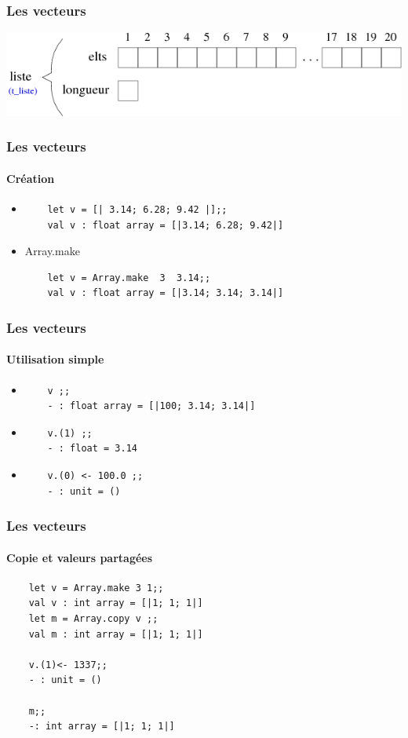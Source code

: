 \begin{frame}
	\frametitle{Les vecteurs}
	\includegraphics[scale=0.5]{pics/vect.png}
\end{frame}

\begin{frame}[fragile]
	\frametitle{Les vecteurs}
	\framesubtitle{Création}
	\begin{itemize}
	\item
	\begin{lstlisting}
	let v = [| 3.14; 6.28; 9.42 |];;
	val v : float array = [|3.14; 6.28; 9.42|]
	\end{lstlisting}

	\item Array.make
	\begin{lstlisting}
	let v = Array.make  3  3.14;;
	val v : float array = [|3.14; 3.14; 3.14|]
	\end{lstlisting}

	\end{itemize}
\end{frame}


\begin{frame}[fragile]
	\frametitle{Les vecteurs}
	\framesubtitle{Utilisation simple}
	\begin{itemize}
	\item
	\begin{lstlisting}
	v ;;
	- : float array = [|100; 3.14; 3.14|]
	\end{lstlisting}

	\item
	\begin{lstlisting}
	v.(1) ;;
	- : float = 3.14
	\end{lstlisting}

	\item
	\begin{lstlisting}
	v.(0) <- 100.0 ;;
	- : unit = ()
	\end{lstlisting}
	\end{itemize}
\end{frame}

\begin{frame}[fragile]
	\frametitle{Les vecteurs}
	\framesubtitle{Copie et valeurs partagées}
	\begin{lstlisting}
	let v = Array.make 3 1;;
	val v : int array = [|1; 1; 1|]
	let m = Array.copy v ;;
	val m : int array = [|1; 1; 1|]

	v.(1)<- 1337;;
	- : unit = ()

	m;;
	-: int array = [|1; 1; 1|]
	\end{lstlisting}
\end{frame}

